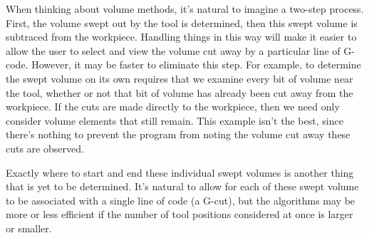 \documentclass[titlepage,oneside,10pt]{article}
\begin{document}
When thinking about volume methods, it's natural to imagine a two-step
process. First, the volume swept out by the tool is determined, then
this swept volume is subtraced from the workpiece. Handling things in
this way will make it easier to allow the user to select and view the
volume cut away by a particular line of G-code. However, it may be
faster to eliminate this step. For example, to determine the swept
volume on its own requires that we examine every bit of volume
near the tool, whether or not that bit of volume has already been cut
away from the workpiece. If the cuts are made directly to the
workpiece, then we need only consider volume elements that still
remain. This example isn't the best, since there's nothing to prevent
the program from noting the volume cut away these cuts are observed.

Exactly where to start and end these
individual swept volumes is another thing that is yet to be
determined. It's natural to allow for each of these swept volume to be
associated with a single line of code (a G-cut), but the algorithms
may be more or less efficient if the number of tool positions
considered at once is larger or smaller.
\end{document}
